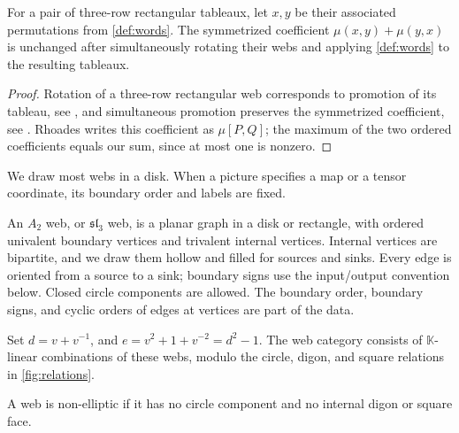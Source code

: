 \documentclass[a4paper,11pt]{amsart}
\newcommand{\F}{\mathbb K}
\newcommand{\tpar}{v}
\numberwithin{equation}{subsection}
\theoremstyle{plain}
\theoremstyle{definition}
\theoremstyle{remark}
\begin{document}
\begin{lemma}\label{lem:rotation}
For a pair of three-row rectangular tableaux, let $x,y$ be their
associated permutations from \autoref{def:words}. The symmetrized
coefficient $\mu(x,y)+\mu(y,x)$ is unchanged after simultaneously
rotating their webs and applying \autoref{def:words} to the resulting
tableaux.
\end{lemma}

\begin{proof}
Rotation of a three-row rectangular web corresponds to promotion
of its tableau, see \cite[Theorem 2.5]{PPR}, and simultaneous promotion
preserves the symmetrized coefficient, see \cite[Proposition 3.2]{Rhoades}.
Rhoades writes this coefficient as $\mu[P,Q]$; the maximum of the
two ordered coefficients equals our sum, since at most one is nonzero.
\end{proof}

We draw most webs in a disk. When a picture specifies a map
or a tensor coordinate, its boundary order and labels are fixed.

\begin{definition}\label{def:web}
An $A_2$ web, or $\mathfrak{sl}_3$ web, is a planar graph in a disk or rectangle, with
ordered univalent boundary vertices and trivalent internal vertices.
Internal vertices are bipartite, and we draw them hollow and filled
for sources and sinks. Every edge is oriented from a source to a sink;
boundary signs use the input/output convention below. Closed circle components
are allowed. The boundary order, boundary signs, and cyclic orders of
edges at vertices are part of the data.

Set
$d=\tpar+\tpar^{-1}$, and $e=\tpar^2+1+\tpar^{-2}=d^2-1$.
The web category consists of $\F$-linear combinations of these
webs, modulo the circle, digon, and square relations in
\autoref{fig:relations}.

A web is non-elliptic if it has no circle component and no
internal digon or square face.
\end{definition}
\end{document}
